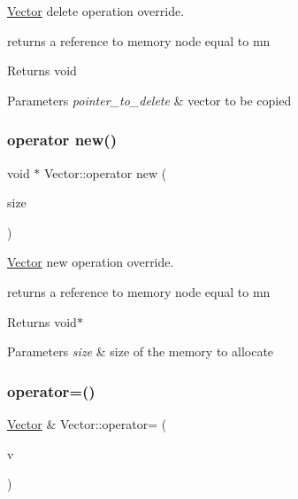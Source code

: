 \hyperlink{class_vector}{Vector} delete operation override. 

returns a reference to memory node equal to mn

\begin{DoxyReturn}{Returns}
void 
\end{DoxyReturn}

\begin{DoxyParams}{Parameters}
{\em pointer\+\_\+to\+\_\+delete} & vector to be copied \\
\hline
\end{DoxyParams}
\mbox{\label{class_vector_a8c34a3b143a7007d8f264cce5d2e3a25}} 
\subsubsection{\texorpdfstring{operator new()}{operator new()}}
{\footnotesize\ttfamily void $\ast$ Vector\+::operator new (\begin{DoxyParamCaption}\item[{size\+\_\+t}]{size }\end{DoxyParamCaption})}



\hyperlink{class_vector}{Vector} new operation override. 

returns a reference to memory node equal to mn

\begin{DoxyReturn}{Returns}
void$\ast$ 
\end{DoxyReturn}

\begin{DoxyParams}{Parameters}
{\em size} & size of the memory to allocate \\
\hline
\end{DoxyParams}
\mbox{\label{class_vector_ae48c467a9f65d60e2f7455aba4ca1239}} 
\subsubsection{\texorpdfstring{operator=()}{operator=()}}
{\footnotesize\ttfamily \hyperlink{class_vector}{Vector} \& Vector\+::operator= (\begin{DoxyParamCaption}\item[{const \hyperlink{class_vector}{Vector} \&}]{v }\end{DoxyParamCaption})}



